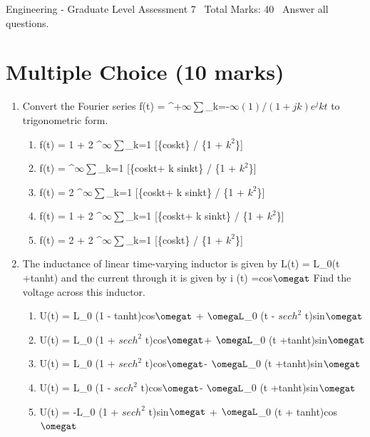 \documentclass[12pt]{article}
\begin{document}
\begin{center}
Engineering - Graduate Level Assessment 7 \
Total Marks: 40 \
Answer all questions.
\end{center}

\section*{Multiple Choice (10 marks)}
\begin{enumerate}[label=\arabic*.]
\item Convert the Fourier series f(t) = ^+\ensuremath{\infty}\ensuremath{\sum}\_k=-\ensuremath{\infty {(1) / (1 +jk)}}$e^jkt$ to trigonometric form.
\begin{enumerate}[label=(\alph*)]
    \item f(t) = 1 + 2 ^\ensuremath{\infty}\ensuremath{\sum}\_k=1 [\{coskt\} / \{1 + $k^2$\}]
    \item f(t) = ^\ensuremath{\infty}\ensuremath{\sum}\_k=1 [\{coskt+ k sinkt\} / \{1 + $k^2$\}]
    \item f(t) = 2 ^\ensuremath{\infty}\ensuremath{\sum}\_k=1 [\{coskt+ k sinkt\} / \{1 + $k^2$\}]
    \item f(t) = 1 + 2 ^\ensuremath{\infty}\ensuremath{\sum}\_k=1 [\{coskt+ k sinkt\} / \{1 + $k^2$\}]
    \item f(t) = 2 + 2 ^\ensuremath{\infty}\ensuremath{\sum}\_k=1 [\{coskt\} / \{1 + $k^2$\}]
\end{enumerate}
\item The inductance of linear time-varying inductor is given by L(t) = L\_0(t +tanht) and the current through it is given by i (t) =cos\ensuremath{\omegat} Find the voltage across this inductor.
\begin{enumerate}[label=(\alph*)]
    \item U(t) = L\_0 (1 - tanht)cos\ensuremath{\omegat} + \ensuremath{\omegaL}\_0 (t - $sech^2$ t)sin\ensuremath{\omegat}
    \item U(t) = L\_0 (1 + $sech^2$ t)cos\ensuremath{\omegat}+ \ensuremath{\omegaL}\_0 (t +tanht)sin\ensuremath{\omegat}
    \item U(t) = L\_0 (1 + $sech^2$ t)cos\ensuremath{\omegat}- \ensuremath{\omegaL}\_0 (t +tanht)sin\ensuremath{\omegat}
    \item U(t) = L\_0 (1 - $sech^2$ t)cos\ensuremath{\omegat}- \ensuremath{\omegaL}\_0 (t +tanht)sin\ensuremath{\omegat}
    \item U(t) = -L\_0 (1 + $sech^2$ t)sin\ensuremath{\omegat} + \ensuremath{\omegaL}\_0 (t + tanht)cos\ensuremath{\omegat}

\end{enumerate}
\end{enumerate}
\end{document}
